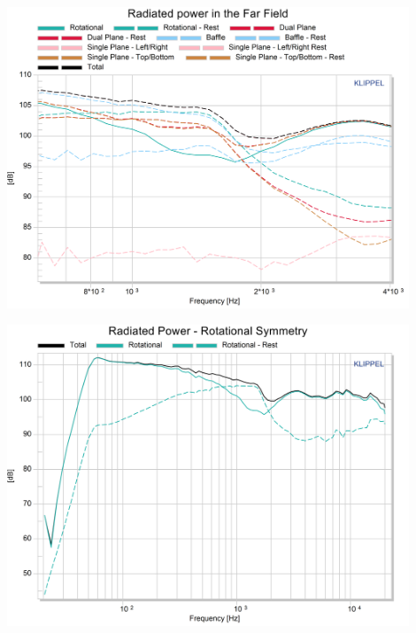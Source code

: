 \documentclass{report}
\begin{document}
\begin{appendices}
\begin{minipage}{0.5\textwidth}
\begin{center}
	\includegraphics[width=0.9\textwidth]{Appendix/Rad_Pow_studio_ZoomHF}
    \captionsetup{hypcap=false}
    \label{Curves:studio_zoom}
\end{center}
\end{minipage}
\begin{minipage}{0.5\textwidth}
\begin{center}
	\includegraphics[width=0.9\textwidth]{Sym/studio_RadPow_Rot}
    \captionsetup{hypcap=false}
    \label{Curves:studio_rot}
\end{center}
\end{minipage}


\end{appendices}
\end{document}
